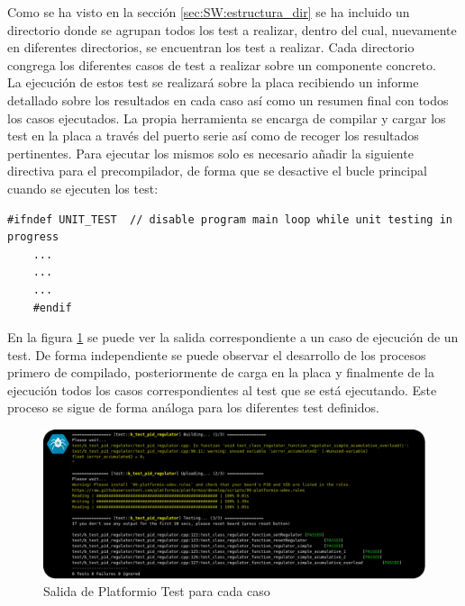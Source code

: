    Como se ha visto en la sección \ref{sec:SW:estructura_dir} se ha incluido un directorio donde se agrupan todos los test a realizar, dentro del cual, nuevamente en diferentes directorios, se encuentran los test a realizar. Cada directorio congrega los diferentes casos de test a realizar sobre un componente concreto.
    \\
    
    La ejecución de estos test se realizará sobre la placa recibiendo un informe detallado sobre los resultados en cada caso así como un resumen final con todos los casos ejecutados. La propia herramienta se encarga de compilar y cargar los test en la placa a través del puerto serie así como de recoger los resultados pertinentes. Para ejecutar los mismos solo es necesario añadir la siguiente directiva para el precompilador, de forma que se desactive el bucle principal cuando se ejecuten los test:

    \begin{lstlisting}[frame=single]
    #ifndef UNIT_TEST  // disable program main loop while unit testing in progress
    ...
    ...
    ...
    #endif
    \end{lstlisting}

    En la figura \ref{fig:SW:test:standard_output} se puede ver la salida correspondiente a un caso de ejecución de un test. De forma independiente se puede observar el desarrollo de los procesos primero de compilado, posteriormente de carga en la placa y finalmente de la ejecución todos los casos correspondientes al test que se está ejecutando. Este proceso se sigue de forma análoga para los diferentes test definidos.

    \begin{figure}[H]
       	\centering
       	\includegraphics[width=1\textwidth]{figuras/Imagenes_SW/test/SWTest_1.jpg}
       	\caption{Salida de Platformio Test para cada caso}
       	\label{fig:SW:test:standard_output}
    \end{figure}

